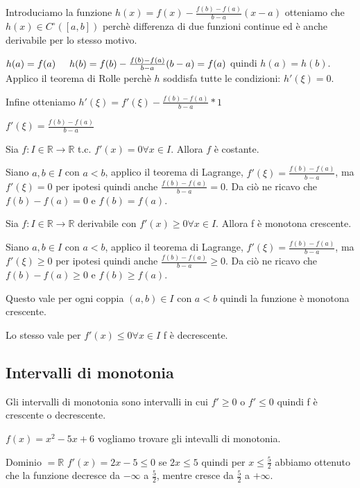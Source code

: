 \begin{dimostration}
    Introduciamo la funzione $h(x)=f(x)-\frac{f(b)-f(a)}{b-a}(x-a)$ otteniamo che $h(x)\in C^\circ([a,b])$ perchè differenza di due funzioni continue ed è anche derivabile per lo stesso motivo.
    
    $h(a)=f(a)\hspace{0,5cm}h(b)=f(b)-\frac{f(b)-f(a)}{b-a}(b-a)=f(a)$ quindi $h(a)=h(b)$. Applico il teorema di Rolle perchè $h$ soddisfa tutte le condizioni: $h'(\xi)=0$.
    
    Infine otteniamo $h'(\xi)=f'(\xi)-\frac{f(b)-f(a)}{b-a}*1$
    
    $f'(\xi)=\frac{f(b)-f(a)}{b-a}$\flushright{$\blacksquare$}
\end{dimostration}

\begin{proposition}
    Sia $f:I\in\mathbb{R}\to\mathbb{R}$ t.c. $f'(x)=0\forall x\in I$. Allora $f$ è costante.
    \begin{dimostration}
        Siano $a,b\in I$ con $a<b$, applico il teorema di Lagrange, $f'(\xi)=\frac{f(b)-f(a)}{b-a}$, ma $f'(\xi)=0$ per ipotesi quindi anche $\frac{f(b)-f(a)}{b-a}=0$. Da ciò ne ricavo che $f(b)-f(a)=0$ e $f(b)=f(a)$.
    \end{dimostration}
\end{proposition}

\begin{proposition}
    Sia $f:I\in\mathbb{R}\to\mathbb{R}$ derivabile con $f'(x)\geq0\forall x\in I$. Allora f è monotona crescente.
    
    \begin{dimostration}
    Siano $a,b\in I$ con $a<b$, applico il teorema di Lagrange, $f'(\xi)=\frac{f(b)-f(a)}{b-a}$, ma $f'(\xi)\geq0$ per ipotesi quindi anche $\frac{f(b)-f(a)}{b-a}\geq0$. Da ciò ne ricavo che $f(b)-f(a)\geq0$ e $f(b)\geq f(a)$.
    
    Questo vale per ogni coppia $(a,b)\in I$ con $a<b$ quindi la funzione è monotona crescente.
    
    Lo stesso vale per $f'(x)\leq0\forall x\in I$ f è decrescente.
    \end{dimostration}
\end{proposition}

\subsection{Intervalli di monotonia}
Gli intervalli di monotonia sono intervalli in cui $f'\geq0$ o $f'\leq0$ quindi f è crescente o decrescente.
\begin{example}
    $f(x)=x^2-5x+6$ vogliamo trovare gli intevalli di monotonia.
    
    Dominio $=\mathbb{R}$ $f'(x)=2x-5\leq0$ se $2x\leq5$ quindi per $x\leq\frac{5}{2}$ abbiamo ottenuto che la funzione decresce da $-\infty$ a $\frac{5}{2}$, mentre cresce da $\frac{5}{2}$ a $+\infty$.
\end{example}

